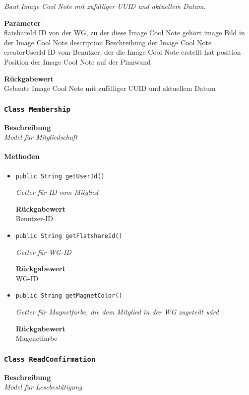 \begin{itemize}
    	\textit{Baut Image Cool Note mit zufälliger UUID und aktuellem Datum.}
    	
    	\textbf{Parameter} \\
    	flatshareId ID von der WG, zu der diese Image Cool Note gehört
    	image Bild in der Image Cool Note
    	description Beschreibung der Image Cool Note
    	creatorUserId ID vom Benutzer, der die Image Cool Note erstellt hat
    	position Position der Image Cool Note auf der Pinnwand
    	
    	\textbf{Rückgabewert} \\
    	Gebaute Image Cool Note mit zufälliger UUID und aktuellem Datum
    \end{itemize}
    \subsubsection{\texttt{Class Membership}}
    \textbf{Beschreibung} \\
    \textit{Model für Mitgliedschaft}
    \paragraph*{Methoden}
    \begin{itemize}
    	\item{\texttt{public String getUserId()}}
    	
    	\textit{Getter für ID vom Mitglied}
    	
    	
    	
    	\textbf{Rückgabewert} \\
    	Benutzer-ID        \item{\texttt{public String getFlatshareId()}}
    	
    	\textit{Getter für WG-ID}
    	
    	
    	
    	\textbf{Rückgabewert} \\
    	WG-ID        \item{\texttt{public String getMagnetColor()}}
    	
    	\textit{Getter für Magnetfarbe, die dem Mitglied in der WG zugeteilt wird}
    	
    	
    	
    	\textbf{Rückgabewert} \\
    	Magenetfarbe
    \end{itemize}
    \subsubsection{\texttt{Class ReadConfirmation}}
    \textbf{Beschreibung} \\
    \textit{Model für Lesebestätigung}
